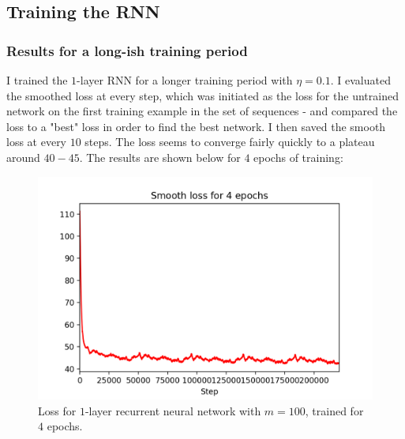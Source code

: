 \documentclass{article}
\begin{document}
\newpage
\subsection*{Training the RNN}

\subsubsection*{Results for a long-ish training period}
	I trained the $1$-layer RNN for a longer training period with $\eta = 0.1$. I evaluated the smoothed loss at every step, which was initiated as the loss for the untrained network on the first training example in the set of sequences - and compared the loss to a "best" loss in order to find the best network. I then saved the smooth loss at every $10$ steps. The loss seems to converge fairly quickly to a plateau around $40-45$. The results are shown below for $4$ epochs of training:

	\begin{figure}[h!]
		\centering
		\includegraphics[width=12cm]{../plots/rnn_loss.png}
		\caption{Loss for $1$-layer recurrent neural network with $m=100$, trained for $4$ epochs.}
 	\end{figure}
\end{document}
